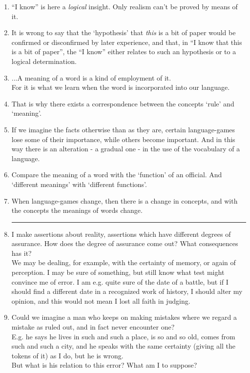 \documentclass{book}
\begin{document}
\begin{enumerate}
\item
``I know'' is here a \emph{logical} insight. Only realism can't be proved by
means of it.

\item
It is wrong to say that the `hypothesis' that \emph{this} is a bit of paper
would be confirmed or disconfirmed by later experience, and that, in ``I know
that this is a bit of paper'', the ``I know'' either relates to such an
hypothesis or to a logical determination.

\item
...A meaning of a word is a kind of employment of it. \\
For it is what we learn when the word is incorporated into our language.

\item
That is why there exists a correspondence between the concepts `rule' and
`meaning'.

\item
If we imagine the facts otherwise than as they are, certain language-games lose
some of their importance, while others become important. And in this way there
is an alteration - a gradual one - in the use of the vocabulary of a language.

\item
Compare the meaning of a word with the `function' of an official. And
`different meanings' with `different functions'.

\item
When language-games change, then there is a change in concepts, and with the
concepts the meanings of words change.

\begin{center}\rule{0.5\linewidth}{\linethickness}\end{center}

\item
I make assertions about reality, assertions which have different degrees of
assurance. How does the degree of assurance come out? What consequences has it?
\\
We may be dealing, for example, with the certainty of memory, or again of
perception. I may be sure of something, but still know what test might convince
me of error. I am e.g. quite sure of the date of a battle, but if I should find
a different date in a recognized work of history, I should alter my opinion,
and this would not mean I lost all faith in judging.

\item
Could we imagine a man who keeps on making mistakes where we regard a mistake
as ruled out, and in fact never encounter one? \\
E.g. he says he lives in such and such a place, is so and so old, comes from
such and such a city, and he speaks with the same certainty (giving all the
tokens of it) as I do, but he is wrong. \\
But what is his relation to this error? What am I to suppose?


\end{enumerate}
\end{document}

